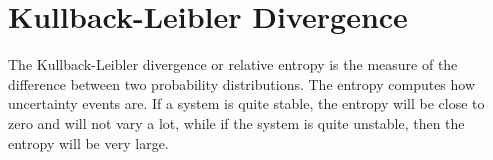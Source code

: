 \section{Kullback-Leibler Divergence}%
\label{app:dkl:dkl}%

The Kullback-Leibler divergence or relative entropy is the measure of the difference between two probability distributions. 
The entropy computes how uncertainty events are. 
If a system is quite stable, the entropy will be close to zero and will not vary a lot, while if the system is quite unstable, then the entropy will be very large. 


